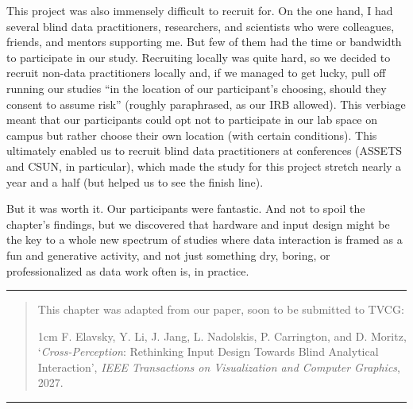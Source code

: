 \documentclass[12pt]{cmuthesis}
\begin{document}
This project was also immensely difficult to recruit for. On the one hand, I had several blind data practitioners, researchers, and scientists who were colleagues, friends, and mentors supporting me. But few of them had the time or bandwidth to participate in our study. Recruiting locally was quite hard, so we decided to recruit non-data practitioners locally and, if we managed to get lucky, pull off running our studies ``in the location of our participant's choosing, should they consent to assume risk'' (roughly paraphrased, as our IRB allowed). This verbiage meant that our participants could opt not to participate in our lab space on campus but rather choose their own location (with certain conditions). This ultimately enabled us to recruit blind data practitioners at conferences (ASSETS and CSUN, in particular), which made the study for this project stretch nearly a year and a half (but helped us to see the finish line).

But it was worth it. Our participants were fantastic. And not to spoil the chapter's findings, but we discovered that hardware and input design might be the key to a whole new spectrum of studies where data interaction is framed as a fun and generative activity, and not just something dry, boring, or professionalized as data work often is, in practice.

\newpage

\noindent\rule{16cm}{0.4pt}
\begin{quote}
This chapter was adapted from our paper, soon to be submitted to TVCG:
\begin{adjustwidth}{1cm}{}
F. Elavsky, Y. Li, J. Jang, L. Nadolskis, P. Carrington, and D. Moritz, ‘\textit{Cross-Perception}: Rethinking Input Design Towards Blind Analytical Interaction’, \textit{IEEE Transactions on Visualization and Computer Graphics}, 2027.
\end{adjustwidth}
\end{quote}
\noindent\rule{16cm}{0.4pt}
\end{document}
